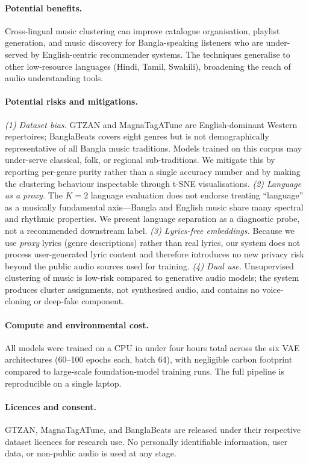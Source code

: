 \documentclass{article}
\begin{document}
\paragraph{Potential benefits.}
Cross-lingual music clustering can improve catalogue organisation, playlist generation,
and music discovery for Bangla-speaking listeners who are under-served by English-centric
recommender systems. The techniques generalise to other low-resource languages
(Hindi, Tamil, Swahili), broadening the reach of audio understanding tools.

\paragraph{Potential risks and mitigations.}
\textit{(1) Dataset bias.} GTZAN and MagnaTagATune are English-dominant Western
repertoires; BanglaBeats covers eight genres but is not demographically representative
of all Bangla music traditions. Models trained on this corpus may under-serve
classical, folk, or regional sub-traditions. We mitigate this by reporting per-genre
purity rather than a single accuracy number and by making the clustering behaviour
inspectable through t-SNE visualisations. \textit{(2) Language as a proxy.} The
$K\!=\!2$ language evaluation does not endorse treating ``language'' as a musically
fundamental axis---Bangla and English music share many spectral and rhythmic properties.
We present language separation as a diagnostic probe, not a recommended downstream
label. \textit{(3) Lyrics-free embeddings.} Because we use \emph{proxy} lyrics (genre
descriptions) rather than real lyrics, our system does not process user-generated lyric
content and therefore introduces no new privacy risk beyond the public audio sources
used for training. \textit{(4) Dual use.} Unsupervised clustering of music is low-risk
compared to generative audio models; the system produces cluster assignments, not
synthesised audio, and contains no voice-cloning or deep-fake component.

\paragraph{Compute and environmental cost.}
All models were trained on a CPU in under four hours total across the six VAE
architectures (60--100 epochs each, batch 64), with negligible carbon footprint
compared to large-scale foundation-model training runs. The full pipeline is
reproducible on a single laptop.

\paragraph{Licences and consent.}
GTZAN, MagnaTagATune, and BanglaBeats are released under their respective dataset
licences for research use. No personally identifiable information, user data, or
non-public audio is used at any stage.
\end{document}
